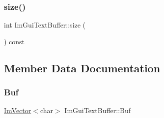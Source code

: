 \subsubsection{\texorpdfstring{size()}{size()}}
{\footnotesize\ttfamily int Im\+Gui\+Text\+Buffer\+::size (\begin{DoxyParamCaption}{ }\end{DoxyParamCaption}) const}



\subsection{Member Data Documentation}
\hypertarget{struct_im_gui_text_buffer_aa6de034b1920cdae5505cc58abf14240}{}\label{struct_im_gui_text_buffer_aa6de034b1920cdae5505cc58abf14240} 
\subsubsection{\texorpdfstring{Buf}{Buf}}
{\footnotesize\ttfamily \hyperlink{class_im_vector}{Im\+Vector}$<$char$>$ Im\+Gui\+Text\+Buffer\+::\+Buf}


